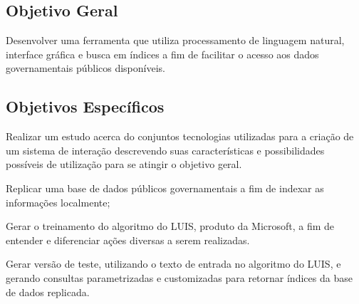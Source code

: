 \subsection{Objetivo Geral}
Desenvolver uma ferramenta que utiliza processamento de linguagem natural, interface gráfica e busca em índices a fim de facilitar o acesso aos dados governamentais públicos disponíveis.

\subsection{Objetivos Específicos}
Realizar um estudo acerca do conjuntos tecnologias utilizadas para a criação de um sistema de interação descrevendo suas características e possibilidades possíveis de utilização para se atingir o objetivo geral.

Replicar uma base de dados públicos governamentais a fim de indexar as informações localmente;

Gerar o treinamento do algoritmo do LUIS, produto da Microsoft, a fim de entender e diferenciar ações diversas a serem realizadas.

Gerar versão de teste, utilizando o texto de entrada no algoritmo do LUIS, e gerando consultas parametrizadas e customizadas para retornar índices da base de dados replicada.
